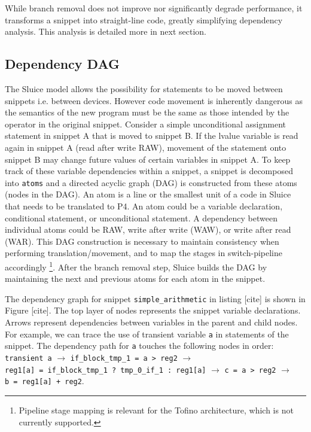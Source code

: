 \documentclass[12pt, oneside]{article}
\begin{document}
While branch removal does not improve nor significantly degrade performance, it transforms a snippet into straight-line code, greatly simplifying dependency analysis. This analysis is detailed more in next section. 

\newpage
\subsection{Dependency DAG}
The Sluice model allows the possibility for statements to be moved between snippets i.e. between devices. However code movement is inherently dangerous as the semantics of the new program must be the same as those intended by the operator in the original snippet. Consider a simple unconditional assignment statement in snippet A that is moved to snippet B. If the lvalue variable is read again in snippet A (read after write RAW), movement of the statement onto snippet B may change future values of certain variables in snippet A.  To keep track of these variable dependencies within a snippet, a snippet is decomposed into \texttt{atoms} and a directed acyclic graph (DAG) is constructed from these atoms (nodes in the DAG). An atom is a line or the smallest unit of a code in Sluice that needs to be translated to P4. An atom could be a variable declaration, conditional statement, or unconditional statement. A dependency between individual atoms could be RAW, write after write (WAW), or write after read (WAR). This DAG construction is necessary to maintain consistency when performing translation/movement, and to map the stages in switch-pipeline accordingly \footnote{Pipeline stage mapping is relevant for the Tofino architecture, which is not currently supported.}. After the branch removal step, Sluice builds the DAG by maintaining the next and previous atoms for each atom in the snippet. 

The dependency graph for snippet \texttt{simple\_arithmetic} in listing [cite] is shown in Figure [cite]. The top layer of nodes represents the snippet variable declarations. Arrows represent dependencies between variables in the parent and child nodes. For example, we can trace the use of transient variable \texttt{a} in statements of the snippet. The dependency path for \texttt{a} touches the following nodes in order: \texttt{transient a} $\longrightarrow$ \texttt{if\_block\_tmp\_1 = a > reg2} $\longrightarrow$ \\ \texttt{reg1[a] = if\_block\_tmp\_1 ? tmp\_0\_if\_1 : reg1[a]} $\longrightarrow$ \texttt{c = a > reg2} $\longrightarrow$ \\ \texttt{b = reg1[a] + reg2}.
\end{document}
